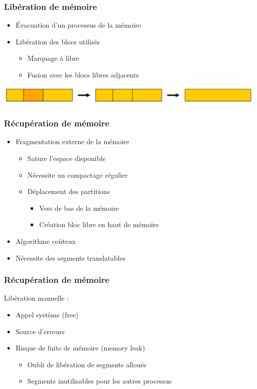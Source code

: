 \begin{frame}
\frametitle{Libération de mémoire}
\begin{itemize}
\item Évacuation d'un processus de la mémoire
\item Libération des blocs utilisés
\begin{itemize}
\item Marquage à libre
\item Fusion avec les blocs libres adjacents
\end{itemize}
\end{itemize}
\includegraphics[width=\textwidth]{../illustration/memoire_principale_liberation_bloc.pdf}
\end{frame}


\begin{frame}
\frametitle{Récupération de mémoire}
\begin{itemize}
\item Fragmentation externe de la mémoire
\begin{itemize}
\item Sature l’espace disponible
\item Nécessite un compactage régulier
\item Déplacement des partitions
\begin{itemize}
\item Vers de bas de la mémoire
\item Création bloc libre en haut de mémoire
\end{itemize}
\end{itemize}

\item Algorithme coûteux
\item Nécessite des segments translatables
\end{itemize}
\end{frame}

\begin{frame}
\frametitle{Récupération de mémoire}
Libération manuelle :
\begin{itemize}
\item Appel système (free)
\item Source d’erreurs
\item Risque de fuite de mémoire (memory leak)
\begin{itemize}
\item Oubli de libération de segments alloués
\item Segments inutilisables pour les autres processus
\end{itemize}
\end{itemize}
\end{frame}


